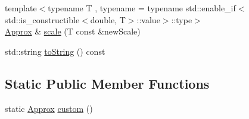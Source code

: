\begin{DoxyCompactItemize}
\item 
{\footnotesize template$<$typename T , typename  = typename std\+::enable\+\_\+if$<$std\+::is\+\_\+constructible$<$double, T$>$\+::value$>$\+::type$>$ }\\\mbox{\hyperlink{class_catch_1_1_detail_1_1_approx}{Approx}} \& \mbox{\hyperlink{class_catch_1_1_detail_1_1_approx_a8f4d2def2920a3840d3271f6d9c5ede2}{scale}} (T const \&new\+Scale)
\item 
std\+::string \mbox{\hyperlink{class_catch_1_1_detail_1_1_approx_a972fd9ac60607483263f1b0f0f9955e6}{to\+String}} () const
\end{DoxyCompactItemize}
\subsection*{Static Public Member Functions}
\begin{DoxyCompactItemize}
\item 
static \mbox{\hyperlink{class_catch_1_1_detail_1_1_approx}{Approx}} \mbox{\hyperlink{class_catch_1_1_detail_1_1_approx_aaf86dc0ee92272ac2d9839197a07951d}{custom}} ()
\end{DoxyCompactItemize}
